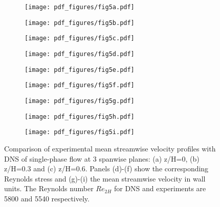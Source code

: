 \documentclass{jfm}
\begin{document}
\begin{figure}
\centering

\begin{subfigure}{.3\textwidth}
  \centering
  \texttt{[image: pdf\_figures/fig5a.pdf]}
  \caption{}
  \label{fig:Umean water 0_0H}
\end{subfigure}%
\begin{subfigure}{.3\textwidth}
  \centering
  \texttt{[image: pdf\_figures/fig5b.pdf]}
  \caption{}
  \label{fig:Umean water 0_3H}
\end{subfigure}
\begin{subfigure}{.3\textwidth}
  \centering
  \texttt{[image: pdf\_figures/fig5c.pdf]}
  \caption{}
  \label{fig:Umean water 0_6H}
\end{subfigure}

\begin{subfigure}{.3\textwidth}
  \centering
  \texttt{[image: pdf\_figures/fig5d.pdf]}
  \caption{}
  \label{fig:uv water 0_0H}
\end{subfigure}%
\begin{subfigure}{.3\textwidth}
  \centering
  \texttt{[image: pdf\_figures/fig5e.pdf]}
  \caption{}
  \label{fig:uv water 0_3H}
\end{subfigure}
\begin{subfigure}{.3\textwidth}
  \centering
  \texttt{[image: pdf\_figures/fig5f.pdf]}
  \caption{}
  \label{fig:uv water 0_6H}
\end{subfigure}

\begin{subfigure}{.32\textwidth}
  \centering
  \texttt{[image: pdf\_figures/fig5g.pdf]}
  \caption{}
  \label{fig:U+ water 0_0H}
\end{subfigure}%
\begin{subfigure}{.32\textwidth}
  \centering
  \texttt{[image: pdf\_figures/fig5h.pdf]}
  \caption{}
  \label{fig:U+ water 0_3H}
\end{subfigure}%
\begin{subfigure}{.32\textwidth}
  \centering
  \texttt{[image: pdf\_figures/fig5i.pdf]}
  \caption{}
  \label{fig:U+ water 0_6H}
\end{subfigure}%

\caption{Comparison of experimental mean streamwise velocity profiles with DNS  of single-phase flow at 3 spanwise planes: (a) z/H=0, (b) z/H=0.3 and (c) z/H=0.6. Panels (d)-(f) show the corresponding Reynolds stress and (g)-(i) the mean streamwise velocity in wall units. The Reynolds number $Re_{2H}$ for DNS and experiments are 5800 and 5540 respectively. }
\label{fig:Single phase comparison}
\end{figure}
\end{document}
